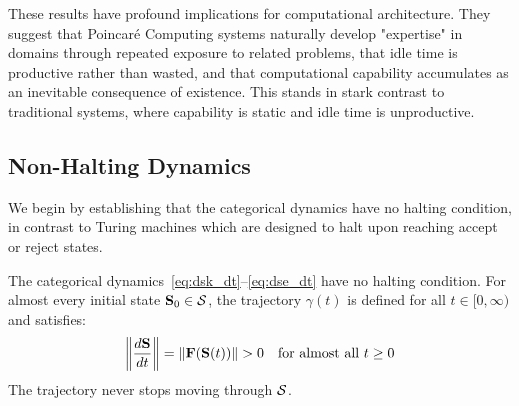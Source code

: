 These results have profound implications for computational architecture. They suggest that Poincaré Computing systems naturally develop "expertise" in domains through repeated exposure to related problems, that idle time is productive rather than wasted, and that computational capability accumulates as an inevitable consequence of existence. This stands in stark contrast to traditional systems, where capability is static and idle time is unproductive.

\subsection{Non-Halting Dynamics}

We begin by establishing that the categorical dynamics have no halting condition, in contrast to Turing machines which are designed to halt upon reaching accept or reject states.

\begin{theorem}[Inexhaustibility]
\label{thm:inexhaustibility}
The categorical dynamics~\eqref{eq:dsk_dt}--\eqref{eq:dse_dt} have no halting condition. For almost every initial state $\mathbf{S}_0 \in \mathcal{S}$, the trajectory $\gamma(t)$ is defined for all $t \in [0, \infty)$ and satisfies:
\begin{equation}
\left\|\frac{d\mathbf{S}}{dt}\right\| = \|\mathbf{F}(\mathbf{S}(t))\| > 0 \quad \text{for almost all } t \geq 0
\label{eq:nonzero_velocity}
\end{equation}
The trajectory never stops moving through $\mathcal{S}$.
\end{theorem}

